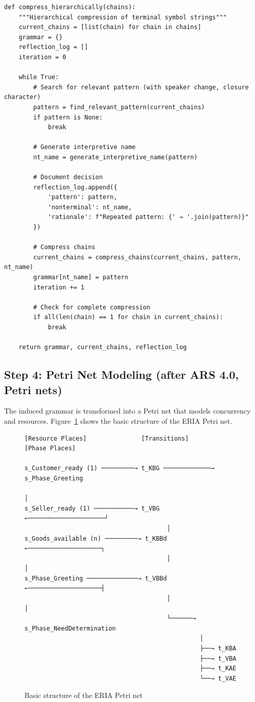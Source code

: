 \documentclass[12pt,a4paper]{article}
\begin{document}
\begin{lstlisting}[caption=Hierarchical compression in ERIA]
def compress_hierarchically(chains):
    """Hierarchical compression of terminal symbol strings"""
    current_chains = [list(chain) for chain in chains]
    grammar = {}
    reflection_log = []
    iteration = 0
    
    while True:
        # Search for relevant pattern (with speaker change, closure character)
        pattern = find_relevant_pattern(current_chains)
        if pattern is None:
            break
        
        # Generate interpretive name
        nt_name = generate_interpretive_name(pattern)
        
        # Document decision
        reflection_log.append({
            'pattern': pattern,
            'nonterminal': nt_name,
            'rationale': f"Repeated pattern: {' → '.join(pattern)}"
        })
        
        # Compress chains
        current_chains = compress_chains(current_chains, pattern, nt_name)
        grammar[nt_name] = pattern
        iteration += 1
        
        # Check for complete compression
        if all(len(chain) == 1 for chain in current_chains):
            break
    
    return grammar, current_chains, reflection_log
\end{lstlisting}

\subsection{Step 4: Petri Net Modeling (after ARS 4.0, Petri nets)}

The induced grammar is transformed into a Petri net that models concurrency and resources. Figure~\ref{fig:petrinet} shows the basic structure of the ERIA Petri net.

\begin{figure}[H]
\centering
\begin{verbatim}
[Resource Places]               [Transitions]              [Phase Places]
                                    
s_Customer_ready (1) ─────────→ t_KBG ─────────────→ s_Phase_Greeting
                                                               │
s_Seller_ready (1) ───────────→ t_VBG ←─────────────────────┘
                                       │
s_Goods_available (n) ─────────→ t_KBBd ←────────────────────┐
                                       │                        │
s_Phase_Greeting ──────────────→ t_VBBd ←────────────────────┤
                                       │                        │
                                       └──────→ s_Phase_NeedDetermination
                                                │
                                                ├──→ t_KBA
                                                ├──→ t_VBA
                                                ├──→ t_KAE
                                                └──→ t_VAE
\end{verbatim}
\caption{Basic structure of the ERIA Petri net}
\label{fig:petrinet}
\end{figure}
\end{document}
